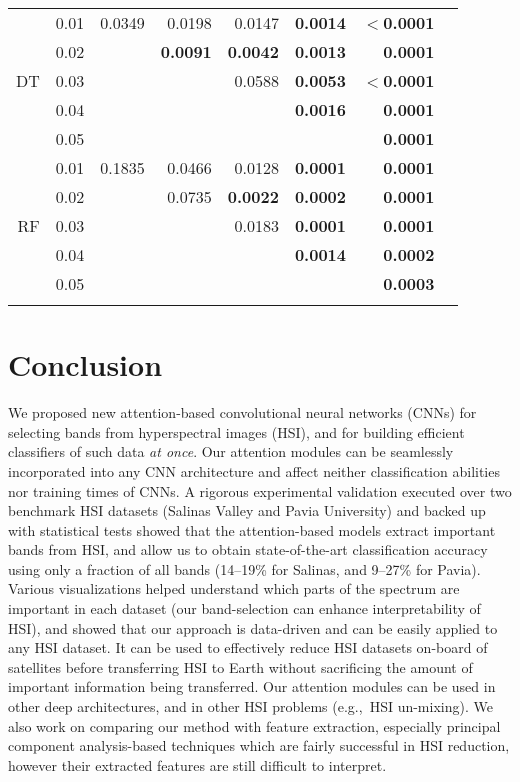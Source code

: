 \documentclass[journal]{IEEEtran}
\begin{document}
\begin{table}[ht!]
\begin{tabular}{rcrrrrrr}
                      \hline
                      & 0.01 & 0.0349 & 0.0198 & 0.0147 & \textbf{0.0014}  &  \textbf{$<$0.0001} \\
	                  & 0.02 &  & \textbf{0.0091} & \textbf{0.0042} & \textbf{0.0013} & \textbf{0.0001}  \\
		      DT      & 0.03 &  &  & 0.0588 & \textbf{0.0053} & \textbf{$<$0.0001}  \\
                      & 0.04 &  &  &  & \textbf{0.0016} &  \textbf{0.0001} \\
                      & 0.05 &  &  &  &  &  \textbf{0.0001} \\
                      \hline
                      & 0.01 & 0.1835 & 0.0466 & 0.0128 & \textbf{0.0001} & \textbf{0.0001}  \\
	                  & 0.02 &  & 0.0735 & \textbf{0.0022} & \textbf{0.0002} & \textbf{0.0001}  \\
		      RF      & 0.03 &  &  & 0.0183 & \textbf{0.0001} & \textbf{0.0001}  \\
                      & 0.04 &  &  &  & \textbf{0.0014} &  \textbf{0.0002} \\
                      & 0.05 &  &  &  &  & \textbf{0.0003}  \\
\hline
		\Xhline{2\arrayrulewidth}
	\end{tabular}
\end{table}
\section{Conclusion}\label{sec:conclusions}

We proposed new attention-based convolutional neural networks (CNNs) for selecting bands from hyperspectral images (HSI), and for building efficient classifiers of such data \emph{at once}. Our attention modules can be seamlessly incorporated into any CNN architecture and affect neither classification abilities nor training times of CNNs. A rigorous experimental validation executed over two benchmark HSI datasets (Salinas Valley and Pavia University) and backed up with statistical tests showed that the attention-based models extract important bands from HSI, and allow us to obtain state-of-the-art classification accuracy using only a fraction of all bands (14--19\% for Salinas, and 9--27\% for Pavia). Various visualizations helped understand which parts of the spectrum are important in each dataset (our band-selection can enhance interpretability of HSI), and showed that our approach is data-driven and can be easily applied to any HSI dataset. It can be used to effectively reduce HSI datasets on-board of satellites before transferring HSI to Earth without sacrificing the amount of important information being transferred. Our attention modules can be used in other deep architectures, and in other HSI problems (e.g.,~HSI un-mixing). We also work on comparing our method with feature extraction, especially principal component analysis-based techniques which are fairly successful in HSI reduction, however their extracted features are still difficult to interpret.







\ifCLASSOPTIONcaptionsoff
  \newpage
\fi



\end{document}
